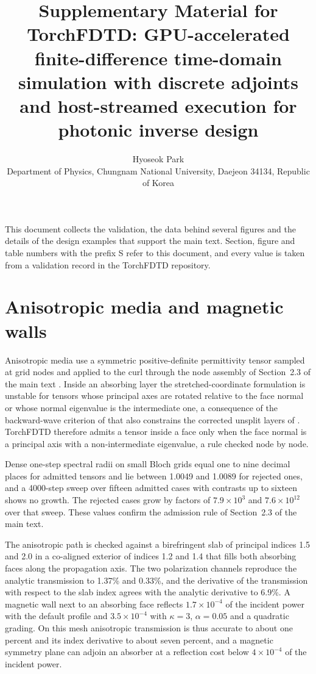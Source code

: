 \documentclass[11pt,a4paper]{article}
\title{\large\bfseries Supplementary Material for\\[4pt] TorchFDTD: GPU-accelerated finite-difference time-domain simulation with discrete adjoints and host-streamed execution for photonic inverse design}
\author{Hyoseok Park\\[2pt]\small Department of Physics, Chungnam National University, Daejeon 34134, Republic of Korea}
\date{}
\begin{document}
\maketitle

This document collects the validation, the data behind several figures and the details of the design examples that support the main text. Section, figure and table numbers with the prefix S refer to this document, and every value is taken from a validation record in the TorchFDTD repository.

\section{Anisotropic media and magnetic walls}
\label{si:aniso}

Anisotropic media use a symmetric positive-definite permittivity tensor sampled at grid nodes and applied to the curl through the node assembly of Section~2.3 of the main text \citep{oskooi2009}. Inside an absorbing layer the stretched-coordinate formulation is unstable for tensors whose principal axes are rotated relative to the face normal or whose normal eigenvalue is the intermediate one, a consequence of the backward-wave criterion of \citet{becache2003} that also constrains the corrected unsplit layers of \citet{oskooi2011}. TorchFDTD therefore admits a tensor inside a face only when the face normal is a principal axis with a non-intermediate eigenvalue, a rule checked node by node.

Dense one-step spectral radii on small Bloch grids equal one to nine decimal places for admitted tensors and lie between 1.0049 and 1.0089 for rejected ones, and a 4000-step sweep over fifteen admitted cases with contrasts up to sixteen shows no growth. The rejected cases grow by factors of $7.9\times10^{3}$ and $7.6\times10^{12}$ over that sweep. These values confirm the admission rule of Section~2.3 of the main text.

The anisotropic path is checked against a birefringent slab of principal indices 1.5 and 2.0 in a co-aligned exterior of indices 1.2 and 1.4 that fills both absorbing faces along the propagation axis. The two polarization channels reproduce the analytic transmission to 1.37\% and 0.33\%, and the derivative of the transmission with respect to the slab index agrees with the analytic derivative to 6.9\%. A magnetic wall next to an absorbing face reflects $1.7\times10^{-4}$ of the incident power with the default profile and $3.5\times10^{-4}$ with $\kappa=3$, $\alpha=0.05$ and a quadratic grading. On this mesh anisotropic transmission is thus accurate to about one percent and its index derivative to about seven percent, and a magnetic symmetry plane can adjoin an absorber at a reflection cost below $4\times10^{-4}$ of the incident power.
\end{document}
